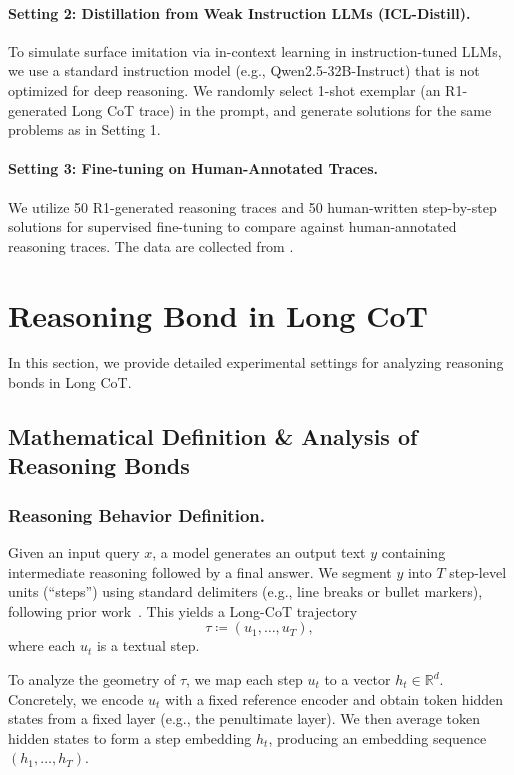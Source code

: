 \paragraph{\textbf{Setting 2: Distillation from Weak Instruction LLMs (ICL-Distill).}}
To simulate surface imitation via in-context learning in instruction-tuned LLMs, we use a standard instruction model (e.g., Qwen2.5-32B-Instruct) that is not optimized for deep reasoning. We randomly select 1-shot exemplar (an R1-generated Long CoT trace) in the prompt, and generate solutions for the same problems as in Setting 1.\vspace{-5pt}


\paragraph{\textbf{Setting 3: Fine-tuning on Human-Annotated Traces.}}
We utilize 50 R1-generated reasoning traces and 50 human-written step-by-step solutions for supervised fine-tuning to compare against human-annotated reasoning traces. The data are collected from \citet{du2025the}.


\section{Reasoning Bond in Long CoT}
In this section, we provide detailed experimental settings for analyzing reasoning bonds in Long CoT.

\subsection{Mathematical Definition \& Analysis of Reasoning Bonds}
\label{append:math}
\subsubsection{Reasoning Behavior Definition.}
Given an input query \(x\), a model generates an output text \(y\) containing intermediate reasoning followed by a final answer.
We segment \(y\) into \(T\) step-level units (``steps'') using standard delimiters (e.g., line breaks or bullet markers), following prior work~\citep{golovneva2023roscoe,chen2024unlocking}.
This yields a Long-CoT trajectory
\begin{equation}
\tau \coloneqq (u_1,\ldots,u_T),
\end{equation}
where each \(u_t\) is a textual step.


To analyze the geometry of \(\tau\), we map each step \(u_t\) to a vector \(h_t \in \mathbb{R}^d\).
Concretely, we encode \(u_t\) with a fixed reference encoder and obtain token hidden states from a fixed layer (e.g., the penultimate layer).
We then average token hidden states to form a step embedding \(h_t\), producing an embedding sequence \((h_1,\ldots,h_T)\).

